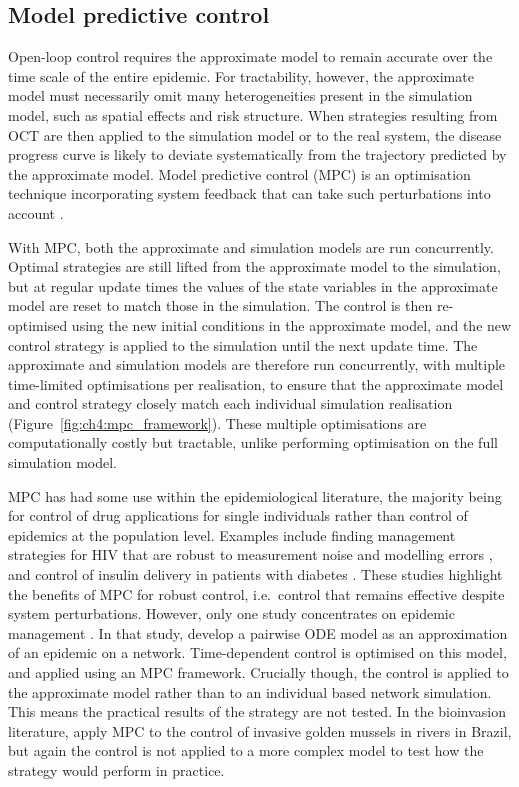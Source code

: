 \subsection{Model predictive control}

Open-loop control requires the approximate model to remain accurate over the time scale of the entire epidemic. For tractability, however, the approximate model must necessarily omit many heterogeneities present in the simulation model, such as spatial effects and risk structure. When strategies resulting from OCT are then applied to the simulation model or to the real system, the disease progress curve is likely to deviate systematically from the trajectory predicted by the approximate model. Model predictive control (MPC) is an optimisation technique incorporating system feedback that can take such perturbations into account \citep{camacho_model_1995, lee_model_2011}.

With MPC, both the approximate and simulation models are run concurrently. Optimal strategies are still lifted from the approximate model to the simulation, but at regular update times the values of the state variables in the approximate model are reset to match those in the simulation. The control is then re-optimised using the new initial conditions in the approximate model, and the new control strategy is applied to the simulation until the next update time. The approximate and simulation models are therefore run concurrently, with multiple time-limited optimisations per realisation, to ensure that the approximate model and control strategy closely match each individual simulation realisation (Figure~\ref{fig:ch4:mpc_framework}). These multiple optimisations are computationally costly but tractable, unlike performing optimisation on the full simulation model.

MPC has had some use within the epidemiological literature, the majority being for control of drug applications for single individuals rather than control of epidemics at the population level. Examples include finding management strategies for HIV that are robust to measurement noise and modelling errors \citep{zurakowski_model_2006, david_receding_2011}, and control of insulin delivery in patients with diabetes \citep{hovorka_nonlinear_2004}. These studies highlight the benefits of MPC for robust control, i.e.\ control that remains effective despite system perturbations. However, only one study concentrates on epidemic management \citep{selley_dynamic_2015}. In that study, \citeauthor{selley_dynamic_2015} develop a pairwise ODE model as an approximation of an epidemic on a network. Time-dependent control is optimised on this model, and applied using an MPC framework. Crucially though, the control is applied to the approximate model rather than to an individual based network simulation. This means the practical results of the strategy are not tested. In the bioinvasion literature, \citet{de_model_2019} apply MPC to the control of invasive golden mussels in rivers in Brazil, but again the control is not applied to a more complex model to test how the strategy would perform in practice.


